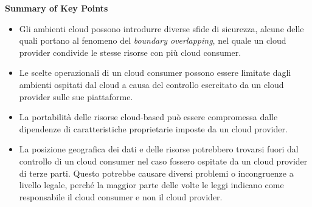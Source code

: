 \begin{mdframed}[backgroundcolor=gray!20,shadow=false]
\textbf{Summary of Key Points}
\begin{itemize}
    \item Gli ambienti cloud possono introdurre diverse sfide di sicurezza, alcune delle quali portano al fenomeno del \textit{boundary overlapping}, nel quale un cloud provider condivide le stesse risorse con più cloud consumer.
    \item Le scelte operazionali di un cloud consumer possono essere limitate dagli ambienti ospitati dal cloud a causa del controllo esercitato da un cloud provider sulle sue piattaforme.
    \item La portabilità delle risorse cloud-based può essere compromessa dalle dipendenze di caratteristiche proprietarie imposte da un cloud provider.
    \item La posizione geografica dei dati e delle risorse potrebbero trovarsi fuori dal controllo di un cloud consumer nel caso fossero ospitate da un cloud provider di terze parti. Questo potrebbe causare diversi problemi o incongruenze a livello legale, perché la maggior parte delle volte le leggi indicano come responsabile il cloud consumer e non il cloud provider.
\end{itemize}
\end{mdframed}

